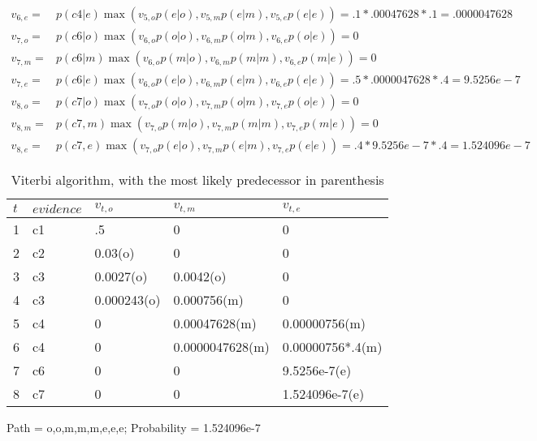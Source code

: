 \documentclass[12pt]{article}
\begin{document}
\begin{align*}
v_{6,e}=&p(c4|e)\max(v_{5,o}p(e|o),v_{5,m}p(e|m),v_{5,e}p(e|e))=.1*.00047628*.1=.0000047628\\
v_{7,o}=&p(c6|o)\max(v_{6,o}p(o|o),v_{6,m}p(o|m),v_{6,e}p(o|e))=0\\
v_{7,m}=&p(c6|m)\max(v_{6,o}p(m|o),v_{6,m}p(m|m),v_{6,e}p(m|e))=0\\
v_{7,e}=&p(c6|e)\max(v_{6,o}p(e|o),v_{6,m}p(e|m),v_{6,e}p(e|e))=.5*.0000047628*.4=9.5256e-7\\
v_{8,o}=&p(c7|o)\max(v_{7,o}p(o|o),v_{7,m}p(o|m),v_{7,e}p(o|e))=0\\
v_{8,m}=&p(c7,m)\max(v_{7,o}p(m|o),v_{7,m}p(m|m),v_{7,e}p(m|e))=0\\
v_{8,e}=&p(c7,e)\max(v_{7,o}p(e|o),v_{7,m}p(e|m),v_{7,e}p(e|e))=.4*9.5256e-7*.4=1.524096e-7
\end{align*}
\begin{table}[htb] \centering
  \begin{tabularx}{\textwidth}{|l|l|X|X|X|} \hline
    $t$ & $evidence$ & $v_{t,o}$ & $v_{t,m}$ & $v_{t,e}$ \\ \hline
    1 & c1 & .5 & 0 & 0 \\ \hline
    2 & c2 & 0.03(o) & 0 & 0 \\ \hline
    3 & c3 & 0.0027(o) & 0.0042(o) & 0 \\ \hline
    4 & c3 & 0.000243(o) & 0.000756(m) & 0 \\ \hline
    5 & c4 & 0 & 0.00047628(m) & 0.00000756(m) \\ \hline
    6 & c4 & 0 & 0.0000047628(m) & 0.00000756*.4(m) \\ \hline
    7 & c6 & 0 & 0 & 9.5256e-7(e) \\ \hline
    8 & c7 & 0 & 0 & 1.524096e-7(e) \\ \hline
  \end{tabularx}
  \caption{Viterbi algorithm, with the most likely predecessor in parenthesis}
  \label{viterbi}
\end{table}
Path = o,o,m,m,m,e,e,e; Probability = 1.524096e-7
\end{document}
